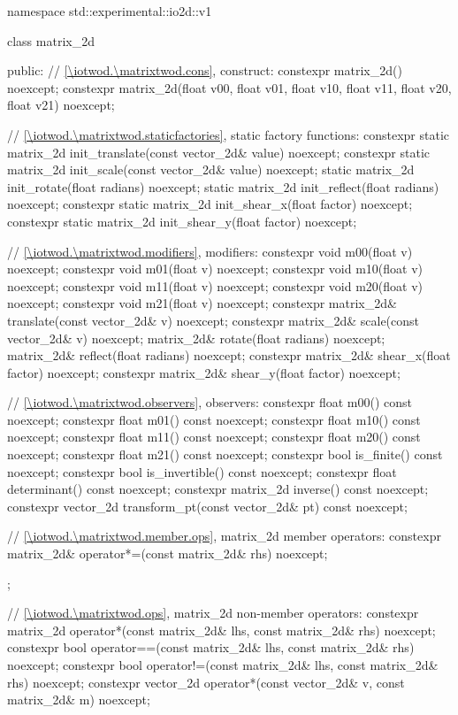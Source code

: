 \begin{codeblock}
namespace std::experimental::io2d::v1 {
  class matrix_2d {
  public:
    // \ref{\iotwod.\matrixtwod.cons}, construct:
    constexpr matrix_2d() noexcept;
    constexpr matrix_2d(float v00, float v01, float v10, float v11,
      float v20, float v21) noexcept;
    
    // \ref{\iotwod.\matrixtwod.staticfactories}, static factory functions:
    constexpr static matrix_2d init_translate(const vector_2d& value) noexcept;
    constexpr static matrix_2d init_scale(const vector_2d& value) noexcept;
    static matrix_2d init_rotate(float radians) noexcept;
    static matrix_2d init_reflect(float radians) noexcept;
    constexpr static matrix_2d init_shear_x(float factor) noexcept;
    constexpr static matrix_2d init_shear_y(float factor) noexcept;
    
    // \ref{\iotwod.\matrixtwod.modifiers}, modifiers:
    constexpr void m00(float v) noexcept;
    constexpr void m01(float v) noexcept;
    constexpr void m10(float v) noexcept;
    constexpr void m11(float v) noexcept;
    constexpr void m20(float v) noexcept;
    constexpr void m21(float v) noexcept;
    constexpr matrix_2d& translate(const vector_2d& v) noexcept;
    constexpr matrix_2d& scale(const vector_2d& v) noexcept;
    matrix_2d& rotate(float radians) noexcept;
    matrix_2d& reflect(float radians) noexcept;
    constexpr matrix_2d& shear_x(float factor) noexcept;
    constexpr matrix_2d& shear_y(float factor) noexcept;
    
    // \ref{\iotwod.\matrixtwod.observers}, observers:
    constexpr float m00() const noexcept;
    constexpr float m01() const noexcept;
    constexpr float m10() const noexcept;
    constexpr float m11() const noexcept;
    constexpr float m20() const noexcept;
    constexpr float m21() const noexcept;
    constexpr bool is_finite() const noexcept;
    constexpr bool is_invertible() const noexcept;
    constexpr float determinant() const noexcept;
    constexpr matrix_2d inverse() const noexcept;
    constexpr vector_2d transform_pt(const vector_2d& pt) const noexcept;
    
    // \ref{\iotwod.\matrixtwod.member.ops}, matrix_2d member operators:
    constexpr matrix_2d& operator*=(const matrix_2d& rhs) noexcept;
  };
    
  // \ref{\iotwod.\matrixtwod.ops}, matrix_2d non-member operators:
  constexpr matrix_2d operator*(const matrix_2d& lhs, const matrix_2d& rhs)
    noexcept;
  constexpr bool operator==(const matrix_2d& lhs, const matrix_2d& rhs)
    noexcept;
  constexpr bool operator!=(const matrix_2d& lhs, const matrix_2d& rhs)
    noexcept;
  constexpr vector_2d operator*(const vector_2d& v, const matrix_2d& m) 
    noexcept;
}
\end{codeblock}

